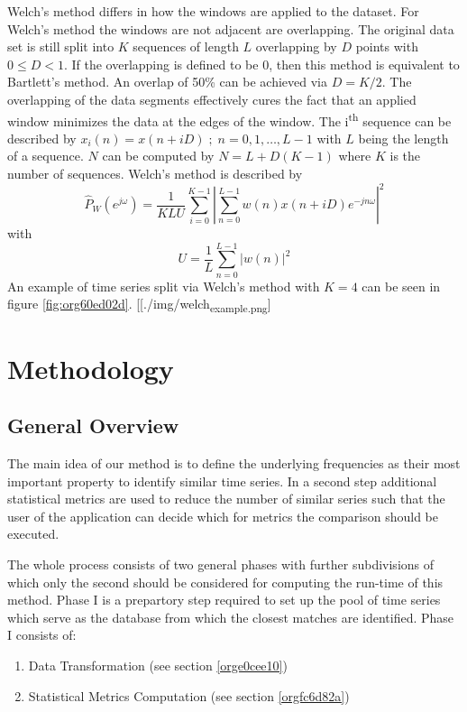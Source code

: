 \documentclass[phd,black, hidelinks]{PrincetonThesis}
\newcommand{\euler}{e}
\begin{document}
Welch's method differs in how the windows are applied to the dataset. For Welch's method the windows are not adjacent are overlapping. The original data set is still split into \(K\) sequences of length \(L\) overlapping by \(D\) points with \(0 \leq D < 1\). If the overlapping is defined to be 0, then this method is equivalent to Bartlett's method. An overlap of 50\% can be achieved via \(D = K/2\). The overlapping of the data segments effectively cures the fact that an applied window minimizes the data at the edges of the window. The i\textsuperscript{th} sequence can be described by \(x_i(n)= x(n+iD) \; ; \; n=0,1,\dots,L-1\) with \(L\) being the length of a sequence. \(N\) can be computed by \(N = L + D(K-1)\) where \(K\) is the number of sequences. Welch's method is described by
\begin{equation}
\hat{P}_W(\euler^{j\omega})=\frac{1}{KLU} \sum_{i=0}^{K-1} \left\lvert \sum_{n=0}^{L-1} w(n)x(n+iD)\euler^{-jn\omega}  \right\rvert^2
\end{equation}
with
\begin{equation}
U = \frac{1}{L} \sum_{n=0}^{L-1} \lvert w(n) \rvert^2
\end{equation}
An example of time series split via Welch's method with \(K=4\) can be seen in figure \ref{fig:org60ed02d}.
[[./img/welch\textsubscript{example.png}]
\chapter{Methodology}
\label{sec:org6c5eea8}
\label{orge0400ec}
\section{General Overview}
\label{sec:orge6162e4}
The main idea of our method is to define the underlying frequencies as their most important property to identify similar time series. In a second step additional statistical metrics are used to reduce the number of similar series such that the user of the application can decide which for metrics the comparison should be executed.

The whole process consists of two general phases with further subdivisions of which only the second should be considered for computing the run-time of this method. Phase I is a  prepartory step required to set up the pool of time series which serve as the database from which the closest matches are identified. Phase I consists of:
\begin{enumerate}
\item Data Transformation (see section \ref{orge0cee10})
\item Statistical Metrics Computation (see section \ref{orgfc6d82a})
\end{enumerate}
\end{document}
